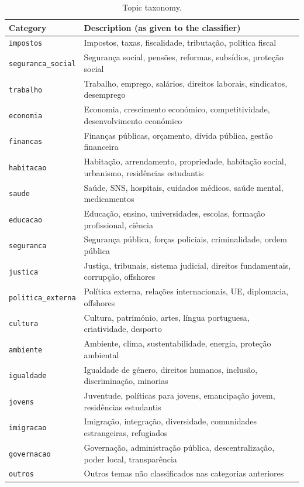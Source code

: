 \begin{table}[h]
    \centering
    \small
    \begin{tabular}{|l|p{}|}
        \hline
        \textbf{Category} & \textbf{Description (as given to the classifier)} \\
        \hline
        \texttt{impostos} & Impostos, taxas, fiscalidade, tributação, política fiscal \\
        \texttt{seguranca\_social} & Segurança social, pensões, reformas, subsídios, proteção social \\
        \texttt{trabalho} & Trabalho, emprego, salários, direitos laborais, sindicatos, desemprego \\
        \texttt{economia} & Economia, crescimento económico, competitividade, desenvolvimento económico \\
        \texttt{financas} & Finanças públicas, orçamento, dívida pública, gestão financeira \\
        \texttt{habitacao} & Habitação, arrendamento, propriedade, habitação social, urbanismo, residências estudantis \\
        \texttt{saude} & Saúde, SNS, hospitais, cuidados médicos, saúde mental, medicamentos \\
        \texttt{educacao} & Educação, ensino, universidades, escolas, formação profissional, ciência \\
        \texttt{seguranca} & Segurança pública, forças policiais, criminalidade, ordem pública \\
        \texttt{justica} & Justiça, tribunais, sistema judicial, direitos fundamentais, corrupção, offshores \\
        \texttt{politica\_externa} & Política externa, relações internacionais, UE, diplomacia, offshores \\
        \texttt{cultura} & Cultura, património, artes, língua portuguesa, criatividade, desporto \\
        \texttt{ambiente} & Ambiente, clima, sustentabilidade, energia, proteção ambiental \\
        \texttt{igualdade} & Igualdade de género, direitos humanos, inclusão, discriminação, minorias \\
        \texttt{jovens} & Juventude, políticas para jovens, emancipação jovem, residências estudantis \\
        \texttt{imigracao} & Imigração, integração, diversidade, comunidades estrangeiras, refugiados \\
        \texttt{governacao} & Governação, administração pública, descentralização, poder local, transparência \\
        \texttt{outros} & Outros temas não classificados nas categorias anteriores \\
        \hline
    \end{tabular}
    \caption{Topic taxonomy.}
    \label{tab:topics}
\end{table}
